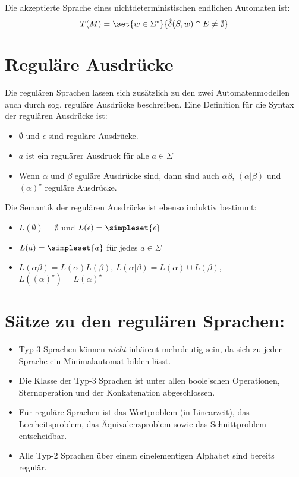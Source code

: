 Die akzeptierte Sprache eines nichtdeterministischen endlichen Automaten ist:
\begin{equation*}
	T(M)=\set{w\in\Sigma^\star}{\hat\delta(S,w)\cap E\neq \emptyset}
\end{equation*}

\section{Reguläre Ausdrücke}
Die regulären Sprachen lassen sich zusätzlich zu den zwei Automatenmodellen auch durch sog. reguläre Ausdrücke beschreiben. Eine Definition für die Syntax der regulären Ausdrücke ist:
\begin{itemize}
	\item $\emptyset$ und $\epsilon$ sind reguläre Ausdrücke.
	\item $a$ ist ein regulärer Ausdruck für alle $a\in\Sigma$
	\item Wenn $\alpha$ und $\beta$ eguläre Ausdrücke sind, dann sind auch $\alpha\beta$, $(\alpha|\beta)$ und $(\alpha)^\star$ reguläre Ausdrücke.
\end{itemize}
Die Semantik der regulären Ausdrücke ist ebenso induktiv bestimmt:
\begin{itemize}
	\item $L(\emptyset)=\emptyset$ und $L(\epsilon)=\simpleset{\epsilon}$
	\item $L(a)=\simpleset{a}$ für jedes $a\in\Sigma$
	\item $L(\alpha \beta)=L(\alpha)L(\beta)$, $L(\alpha|\beta)=L(\alpha)\cup L(\beta)$, $L((\alpha)^\star)=L(\alpha)^\star$
\end{itemize}



\section{Sätze zu den regulären Sprachen:}
\begin{itemize}
	\item Typ-3 Sprachen können \emph{nicht} inhärent mehrdeutig sein, da sich zu jeder Sprache ein Minimalautomat bilden lässt.
	\item Die Klasse der Typ-3 Sprachen ist unter allen boole'schen Operationen, Sternoperation und der Konkatenation abgeschlossen.
	\item Für reguläre Sprachen ist das Wortproblem (in Linearzeit), das Leerheitsproblem, das Äquivalenzproblem sowie das Schnittproblem entscheidbar.
	\item Alle Typ-2 Sprachen über einem einelementigen Alphabet sind bereits regulär.
\end{itemize}
